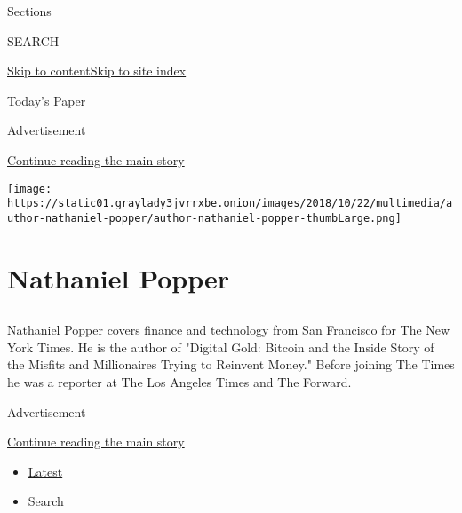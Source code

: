 Sections

SEARCH

\protect\hyperlink{site-content}{Skip to
content}\protect\hyperlink{site-index}{Skip to site index}

\href{https://myaccount.nytimes3xbfgragh.onion/auth/login?response_type=cookie\&client_id=vi}{}

\href{https://www.nytimes3xbfgragh.onion/section/todayspaper}{Today's
Paper}

Advertisement

\protect\hyperlink{after-top}{Continue reading the main story}

\texttt{[image: https://static01.graylady3jvrrxbe.onion/images/2018/10/22/multimedia/author-nathaniel-popper/author-nathaniel-popper-thumbLarge.png]}

\hypertarget{nathaniel-popper}{%
\section{Nathaniel Popper}\label{nathaniel-popper}}

\hypertarget{section}{%
\subsection{}\label{section}}

Nathaniel Popper covers finance and technology from San Francisco for
The New York Times. He is the author of "Digital Gold: Bitcoin and the
Inside Story of the Misfits and Millionaires Trying to Reinvent Money."
Before joining The Times he was a reporter at The Los Angeles Times and
The Forward.

Advertisement

\protect\hyperlink{after-mid1}{Continue reading the main story}

\begin{itemize}
\tightlist
\item
  \protect\hyperlink{stream-panel}{Latest}
\item
  Search
\end{itemize}


